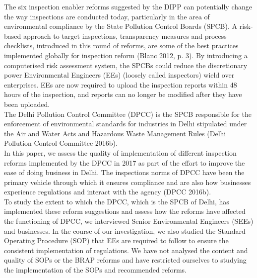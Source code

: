 \documentclass[a4paper, 12pt]{article}
\begin{document}
                  The six inspection enabler reforms suggested by the DIPP can potentially change the way inspections are conducted today, particularly in the area of environmental compliance by the State Pollution Control Boards (SPCB). A risk-based approach to target inspections, transparency measures and process checklists, introduced in this round of reforms, are some of the best practices implemented globally for inspection reform (Blanc 2012, p. 3). By introducing a computerised risk assessment system, the SPCBs could reduce the discretionary power Environmental Engineers (EEs) (loosely called inspectors) wield over enterprises. EEs are now required to upload the inspection reports within 48 hours of the inspection, and reports can no longer be modified after they have been uploaded. \\
                  
                 The Delhi Pollution Control Committee (DPCC) is the SPCB responsible for the enforcement of environmental standards for industries in Delhi stipulated under the Air and Water Acts and Hazardous Waste Management Rules (Delhi Pollution Control Committee 2016b). \\
                 
                 In this paper, we assess the quality of implementation of different inspection reforms implemented by the DPCC in 2017 as part of the effort to improve the ease of doing business in Delhi. The inspections norms of DPCC have been the primary vehicle through which it ensures compliance and are also how businesses experience regulations and interact with the agency (DPCC 2016b). \\
                 
                 To study the extent to which the DPCC, which is the SPCB of Delhi, has implemented these reform suggestions and assess how the reforms have affected the functioning of DPCC, we interviewed Senior Environmental Engineers (SEEs) and businesses. In the course of our investigation, we also studied the Standard Operating Procedure (SOP) that EEs are required to follow to ensure the consistent implementation of regulations. We have not analysed the content and quality of SOPs or the BRAP reforms and have restricted ourselves to studying the implementation of the SOPs and recommended reforms. \\
                 
\end{document}
